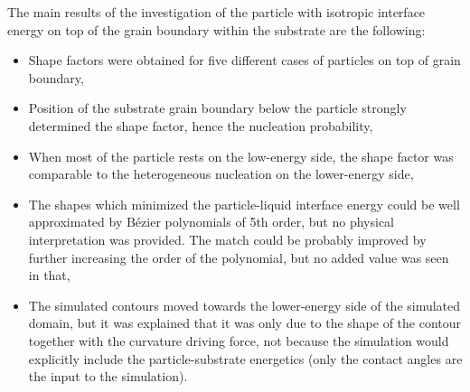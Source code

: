 The main results of the investigation of the particle with isotropic interface energy on top of the grain boundary within the substrate are the following:
\begin{itemize}
	\item Shape factors were obtained for five different cases of particles on top of grain boundary,
	\item Position of the substrate grain boundary below the particle strongly determined the shape factor, hence the nucleation probability,
	\item When most of the particle rests on the low-energy side, the shape factor was comparable to the heterogeneous nucleation on the lower-energy side,
	\item The shapes which minimized the particle-liquid interface energy could be well approximated by Bézier polynomials of 5th order, but no physical interpretation was provided. The match could be probably improved by further increasing the order of the polynomial, but no added value was seen in that,
	\item The simulated contours moved towards the lower-energy side of the simulated domain, but it was explained that it was only due to the shape of the contour together with the curvature driving force, not because the simulation would explicitly include the particle-substrate energetics (only the contact angles are the input to the simulation).
\end{itemize}

\cleardoublepage

